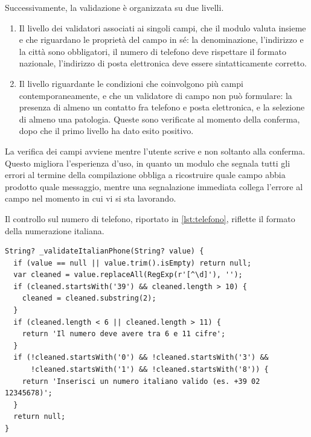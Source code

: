 Successivamente, la validazione è organizzata su due livelli.%

\begin{enumerate}
  \item Il livello dei validatori associati ai singoli campi, che il modulo valuta insieme e che riguardano le proprietà
  del campo in sé: la denominazione, l'indirizzo e la città sono obbligatori, il numero di telefono deve rispettare il
  formato nazionale, l'indirizzo di posta elettronica deve essere sintatticamente corretto.
  \item Il livello riguardante le condizioni che coinvolgono più campi contemporaneamente, e che un validatore di campo non può
  formulare: la presenza di almeno un contatto fra telefono e posta elettronica, e la selezione di almeno una patologia.
  Queste sono verificate al momento della conferma, dopo che il primo livello ha dato esito positivo.
\end{enumerate}

La verifica dei campi avviene mentre l'utente scrive e non soltanto alla conferma.
Questo migliora l'esperienza d'uso, in quanto un modulo che segnala tutti gli errori al termine della
compilazione obbliga a ricostruire quale campo abbia prodotto quale messaggio, mentre una segnalazione immediata collega
l'errore al campo nel momento in cui vi si sta lavorando.

Il controllo sul numero di telefono, riportato in \ref{lst:telefono},
riflette il formato della numerazione italiana. %

\begin{listing}[H]
\begin{verbatim}
String? _validateItalianPhone(String? value) {
  if (value == null || value.trim().isEmpty) return null;
  var cleaned = value.replaceAll(RegExp(r'[^\d]'), '');
  if (cleaned.startsWith('39') && cleaned.length > 10) {
    cleaned = cleaned.substring(2);
  }
  if (cleaned.length < 6 || cleaned.length > 11) {
    return 'Il numero deve avere tra 6 e 11 cifre';
  }
  if (!cleaned.startsWith('0') && !cleaned.startsWith('3') &&
      !cleaned.startsWith('1') && !cleaned.startsWith('8')) {
    return 'Inserisci un numero italiano valido (es. +39 02 12345678)';
  }
  return null;
}
\end{verbatim}
\caption{Validazione del numero di telefono secondo il formato della numerazione italiana.}
\label{lst:telefono}
\end{listing}

